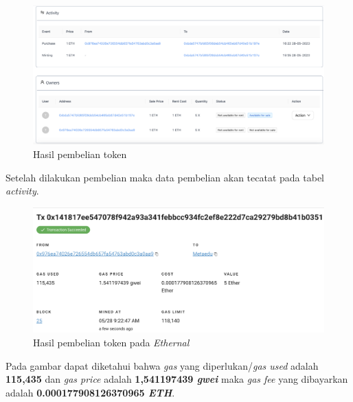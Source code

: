 \begin{itemize}
        \begin{figure} [H] \centering
          \includegraphics[scale=0.3]{gambar/img-test-share-buy-3.png}
          \caption{Hasil pembelian token}
          \label{fig:TestShareResultBuy}
        \end{figure}
        Setelah dilakukan pembelian maka data pembelian akan tecatat pada tabel \emph{activity}.
        \begin{figure} [H] \centering
          \includegraphics[scale=0.4]{gambar/img-test-share-buy-4.png}
          \caption{Hasil pembelian token pada \emph{Ethernal}}
          \label{fig:TestShareResultBuy2}
        \end{figure}
        Pada gambar dapat diketahui bahwa \emph{gas} yang diperlukan/\emph{gas used} adalah \textbf{115,435} dan \emph{gas price} adalah \textbf{1,541197439 \emph{gwei}} maka \emph{gas fee} yang dibayarkan adalah \textbf{0.000177908126370965 \emph{ETH}}.
        

\end{itemize}
